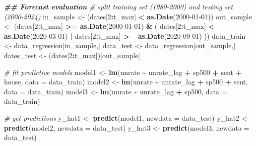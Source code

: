 \documentclass[
]{book}
\newenvironment{Shaded}{\begin{snugshade}}{\end{snugshade}}
\newcommand{\AttributeTok}[1]{\textcolor[rgb]{0.13,0.29,0.53}{#1}}
\newcommand{\CommentTok}[1]{\textcolor[rgb]{0.56,0.35,0.01}{\textit{#1}}}
\newcommand{\DecValTok}[1]{\textcolor[rgb]{0.00,0.00,0.81}{#1}}
\newcommand{\DocumentationTok}[1]{\textcolor[rgb]{0.56,0.35,0.01}{\textbf{\textit{#1}}}}
\newcommand{\FunctionTok}[1]{\textcolor[rgb]{0.13,0.29,0.53}{\textbf{#1}}}
\newcommand{\NormalTok}[1]{#1}
\newcommand{\OtherTok}[1]{\textcolor[rgb]{0.56,0.35,0.01}{#1}}
\newcommand{\SpecialCharTok}[1]{\textcolor[rgb]{0.81,0.36,0.00}{\textbf{#1}}}
\newcommand{\StringTok}[1]{\textcolor[rgb]{0.31,0.60,0.02}{#1}}
\begin{document}
\begin{Shaded}
\begin{Highlighting}[]
\DocumentationTok{\#\# Forecast evaluation}
\CommentTok{\# split training set (1980{-}2000) and testing set (2000{-}2024)}
\NormalTok{in\_sample  }\OtherTok{\textless{}{-}}\NormalTok{ (dates[}\DecValTok{2}\SpecialCharTok{:}\NormalTok{t\_max] }\SpecialCharTok{\textless{}} \FunctionTok{as.Date}\NormalTok{(}\StringTok{\textquotesingle{}2000{-}01{-}01\textquotesingle{}}\NormalTok{))}
\NormalTok{out\_sample }\OtherTok{\textless{}{-}}\NormalTok{ (dates[}\DecValTok{2}\SpecialCharTok{:}\NormalTok{t\_max] }\SpecialCharTok{\textgreater{}=} \FunctionTok{as.Date}\NormalTok{(}\StringTok{\textquotesingle{}2000{-}01{-}01\textquotesingle{}}\NormalTok{) }\SpecialCharTok{\&} 
\NormalTok{                 ( dates[}\DecValTok{2}\SpecialCharTok{:}\NormalTok{t\_max] }\SpecialCharTok{\textless{}} \FunctionTok{as.Date}\NormalTok{(}\StringTok{\textquotesingle{}2020{-}03{-}01\textquotesingle{}}\NormalTok{) }\SpecialCharTok{|} 
\NormalTok{                     dates[}\DecValTok{2}\SpecialCharTok{:}\NormalTok{t\_max] }\SpecialCharTok{\textgreater{}=} \FunctionTok{as.Date}\NormalTok{(}\StringTok{\textquotesingle{}2020{-}09{-}01\textquotesingle{}}\NormalTok{) ))}
\NormalTok{data\_train }\OtherTok{\textless{}{-}}\NormalTok{ data\_regression[in\_sample,]}
\NormalTok{data\_test }\OtherTok{\textless{}{-}}\NormalTok{ data\_regression[out\_sample,]}
\NormalTok{dates\_test }\OtherTok{\textless{}{-}}\NormalTok{ (dates[}\DecValTok{2}\SpecialCharTok{:}\NormalTok{t\_max])[out\_sample]}

\CommentTok{\# fit predictive models}
\NormalTok{model1 }\OtherTok{\textless{}{-}} \FunctionTok{lm}\NormalTok{(unrate }\SpecialCharTok{\textasciitilde{}}\NormalTok{ unrate\_lag }\SpecialCharTok{+}\NormalTok{ sp500 }\SpecialCharTok{+}\NormalTok{ sent }\SpecialCharTok{+}\NormalTok{ house, }\AttributeTok{data =}\NormalTok{ data\_train)}
\NormalTok{model2 }\OtherTok{\textless{}{-}} \FunctionTok{lm}\NormalTok{(unrate }\SpecialCharTok{\textasciitilde{}}\NormalTok{ unrate\_lag }\SpecialCharTok{+}\NormalTok{ sp500 }\SpecialCharTok{+}\NormalTok{ sent,         }\AttributeTok{data =}\NormalTok{ data\_train)}
\NormalTok{model3 }\OtherTok{\textless{}{-}} \FunctionTok{lm}\NormalTok{(unrate }\SpecialCharTok{\textasciitilde{}}\NormalTok{ unrate\_lag }\SpecialCharTok{+}\NormalTok{ sp500,                }\AttributeTok{data =}\NormalTok{ data\_train)}

\CommentTok{\# get predictions}
\NormalTok{y\_hat1 }\OtherTok{\textless{}{-}} \FunctionTok{predict}\NormalTok{(model1, }\AttributeTok{newdata =}\NormalTok{ data\_test)}
\NormalTok{y\_hat2 }\OtherTok{\textless{}{-}} \FunctionTok{predict}\NormalTok{(model2, }\AttributeTok{newdata =}\NormalTok{ data\_test)}
\NormalTok{y\_hat3 }\OtherTok{\textless{}{-}} \FunctionTok{predict}\NormalTok{(model3, }\AttributeTok{newdata =}\NormalTok{ data\_test)}


\end{Highlighting}
\end{Shaded}
\end{document}
